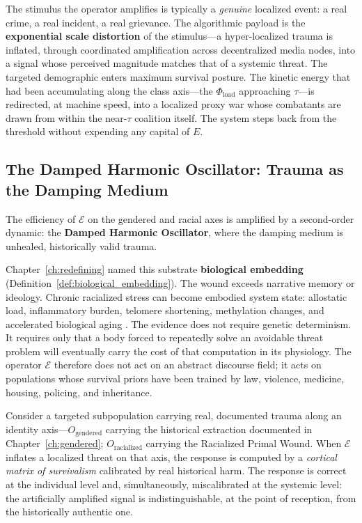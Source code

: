 The stimulus the operator amplifies is typically a \textit{genuine} localized event: a real crime, a real incident, a real grievance. The algorithmic payload is the \textbf{exponential scale distortion} of the stimulus---a hyper-localized trauma is inflated, through coordinated amplification across decentralized media nodes, into a signal whose perceived magnitude matches that of a systemic threat. The targeted demographic enters maximum survival posture. The kinetic energy that had been accumulating along the class axis---the $\Phi_{\text{load}}$ approaching $\tau$---is redirected, at machine speed, into a localized proxy war whose combatants are drawn from within the near-$\tau$ coalition itself. The system steps back from the threshold without expending any capital of $E$.

\subsection{The Damped Harmonic Oscillator: Trauma as the Damping Medium}

The efficiency of $\mathcal{E}$ on the gendered and racial axes is amplified by a second-order dynamic: the \textbf{Damped Harmonic Oscillator}, where the damping medium is unhealed, historically valid trauma.

Chapter~\ref{ch:redefining} named this substrate \textbf{biological embedding}
(Definition~\ref{def:biological_embedding}). The wound exceeds narrative
memory or ideology. Chronic racialized stress can become embodied system state:
allostatic load, inflammatory burden, telomere shortening, methylation changes,
and accelerated biological aging
\cite{geronimus_weathering_2006,duru_allostatic_mortality_2012,ruiz_narvaez_racism_methylation_2024,spears_lifespan_stress_inflammation_2026}.
The evidence does not require genetic determinism. It requires only that a body
forced to repeatedly solve an avoidable threat problem will eventually carry the
cost of that computation in its physiology. The operator $\mathcal{E}$ therefore
does not act on an abstract discourse field; it acts on populations whose
survival priors have been trained by law, violence, medicine, housing, policing,
and inheritance.

Consider a targeted subpopulation carrying real, documented trauma along an identity axis---$O_{\text{gendered}}$ carrying the historical extraction documented in Chapter~\ref{ch:gendered}; $O_{\text{racialized}}$ carrying the Racialized Primal Wound. When $\mathcal{E}$ inflates a localized threat on that axis, the response is computed by a \textit{cortical matrix of survivalism} calibrated by real historical harm. The response is correct at the individual level and, simultaneously, miscalibrated at the systemic level: the artificially amplified signal is indistinguishable, at the point of reception, from the historically authentic one.

